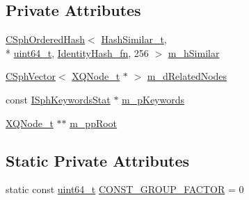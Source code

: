 \subsection*{Private Attributes}
\begin{DoxyCompactItemize}
\item 
\hyperlink{classCSphOrderedHash}{C\-Sph\-Ordered\-Hash}$<$ \hyperlink{classCSphTransformation_ac577c5486ae52a9b956ca6974fa77ab6}{Hash\-Similar\-\_\-t}, \\*
\hyperlink{sphinxstd_8h_aaa5d1cd013383c889537491c3cfd9aad}{uint64\-\_\-t}, \hyperlink{structIdentityHash__fn}{Identity\-Hash\-\_\-fn}, 256 $>$ \hyperlink{classCSphTransformation_a86a5ccda35fdd2db173ed3b866f2b835}{m\-\_\-h\-Similar}
\item 
\hyperlink{classCSphVector}{C\-Sph\-Vector}$<$ \hyperlink{structXQNode__t}{X\-Q\-Node\-\_\-t} $\ast$ $>$ \hyperlink{classCSphTransformation_a0b7851b1247b258d6cc257167bb208bf}{m\-\_\-d\-Related\-Nodes}
\item 
const \hyperlink{structISphKeywordsStat}{I\-Sph\-Keywords\-Stat} $\ast$ \hyperlink{classCSphTransformation_a30ec948b31d378614b00f6846eb86810}{m\-\_\-p\-Keywords}
\item 
\hyperlink{structXQNode__t}{X\-Q\-Node\-\_\-t} $\ast$$\ast$ \hyperlink{classCSphTransformation_a22e11aba813c6cd8fccd1268da6f099e}{m\-\_\-pp\-Root}
\end{DoxyCompactItemize}
\subsection*{Static Private Attributes}
\begin{DoxyCompactItemize}
\item 
static const \hyperlink{sphinxstd_8h_aaa5d1cd013383c889537491c3cfd9aad}{uint64\-\_\-t} \hyperlink{classCSphTransformation_aeca4dfd2d1c8e70ca26e68eeb9957b8b}{C\-O\-N\-S\-T\-\_\-\-G\-R\-O\-U\-P\-\_\-\-F\-A\-C\-T\-O\-R} = 0
\end{DoxyCompactItemize}


